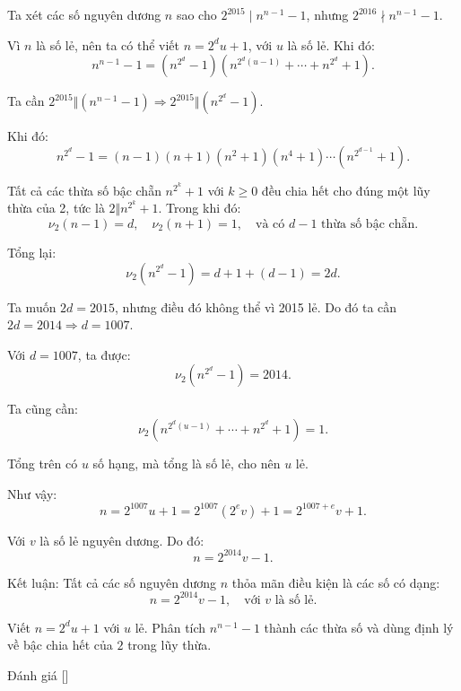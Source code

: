 \ifshowproblemandsoln
\ifshowproblem{}
\fi

\ifshowsoln
\begin{soln}\footnotemark
    Ta xét các số nguyên dương \( n \) sao cho \( 2^{2015} \mid n^{n-1} - 1 \), nhưng \( 2^{2016} \nmid n^{n-1} - 1 \).

    Vì \( n \) là số lẻ, nên ta có thể viết \( n = 2^d u + 1 \), với \( u \) là số lẻ. Khi đó:
    \[
        n^{n - 1} - 1 = (n^{2^d} - 1)\left(n^{2^d(u - 1)} + \cdots + n^{2^d} + 1\right).
    \]

    Ta cần \( 2^{2015} \Vert (n^{n - 1} - 1) \Rightarrow 2^{2015} \Vert (n^{2^d} - 1) \).

    Khi đó:
    \[
        n^{2^d} - 1 = (n - 1)(n + 1)(n^2 + 1)(n^4 + 1) \cdots (n^{2^{d - 1}} + 1).
    \]

    Tất cả các thừa số bậc chẵn \( n^{2^k} + 1 \) với \( k \ge 0 \) đều chia hết cho đúng một lũy thừa của 2, tức là \( 2 \Vert n^{2^k} + 1 \). Trong khi đó:
    \[
        \nu_2(n - 1) = d,\quad \nu_2(n + 1) = 1,\quad \text{và có } d - 1 \text{ thừa số bậc chẵn}.
    \]

    Tổng lại:
    \[
        \nu_2(n^{2^d} - 1) = d + 1 + (d - 1) = 2d.
    \]
    
    Ta muốn \( 2d = 2015 \), nhưng điều đó không thể vì 2015 lẻ. Do đó ta cần \( 2d = 2014 \Rightarrow d = 1007 \).

    Với \( d = 1007 \), ta được:
    \[
        \nu_2(n^{2^d} - 1) = 2014.
    \]

    Ta cũng cần:
    \[
        \nu_2\left(n^{2^d(u - 1)} + \cdots + n^{2^d} + 1\right) = 1.
    \]

    Tổng trên có \( u \) số hạng, mà tổng là số lẻ, cho nên \( u \) lẻ.

    Như vậy:
    \[
        n = 2^{1007} u + 1 = 2^{1007}(2^e v) + 1 = 2^{1007 + e} v + 1.
    \]

    Với \( v \) là số lẻ nguyên dương. Do đó:
    \[
        n = 2^{2014} v - 1.
    \]

    Kết luận: Tất cả các số nguyên dương \( n \) thỏa mãn điều kiện là các số có dạng:
    \[
        \boxed{n = 2^{2014} v - 1}, \quad \text{với } v \text{ là số lẻ}.
    \]
\end{soln}
\fi

\ifshowhint
\begin{hint*}
    Viết \( n = 2^d u + 1 \) với \( u \) lẻ. Phân tích \( n^{n-1} - 1 \) thành các thừa số và dùng định lý về bậc chia hết của \( 2 \) trong lũy thừa.
\end{hint*}
\fi

\ifshowremark
\begin{remark*}
    Đánh giá [\textbf{}]
\end{remark*}
\newpage
\fi
